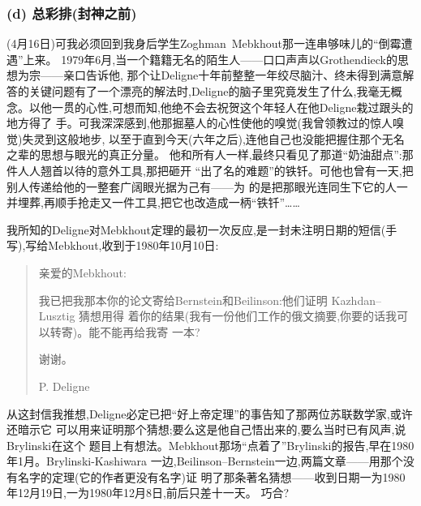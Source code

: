 \subsubsection*{(d) 总彩排(封神之前)}

(4月16日)可我必须回到我身后学生Zoghman~Mebkhout那一连串够味儿的“倒霉遭遇”上来。
\dmark{}1979年6月,当一个籍籍无名的陌生人——口口声声以Grothendieck的思想为宗——亲口告诉他,
那个让Deligne十年前整整一年绞尽脑汁、终未得到满意解答的关键问题有了一个漂亮的解法时,Deligne的脑子里究竟发生了什么,我毫无概
念。以他一贯的心性,可想而知,他绝不会去祝贺这个年轻人在他Deligne栽过跟头的地方得了
手。可我深深感到,他那掘墓人的心性使他的嗅觉(我曾领教过的惊人嗅觉)失灵到这般地步,
以至于直到今天(六年之后),连他自己也没能把握住那个无名之辈的思想与眼光的真正分量。
他和所有人一样,最终只看见了那道“奶油甜点”:那件人人翘首以待的意外工具,那把砸开
“出了名的难题”的铁钎。可他也曾有一天,把别人传递给他的一整套广阔眼光据为己有——为
的是把那眼光连同生下它的人一并埋葬,再顺手抢走又一件工具,把它也改造成一柄“铁钎”……

我所知的Deligne对Mebkhout定理的最初一次反应,是一封未注明日期的短信(手写),写给Mebkhout,收到于1980年10月10日:

\begin{quote}
亲爱的Mebkhout:

我已把我那本你的论文寄给Bernstein和Beilinson:他们证明 Kazhdan--Lusztig 猜想用得
着你的结果(我有一份他们工作的俄文摘要,你要的话我可以转寄)。能不能再给我寄
一本?

谢谢。

P. Deligne
\end{quote}

从这封信我推想,Deligne必定已把“好上帝定理”的事告知了那两位苏联数学家,或许还暗示它
可以用来证明那个猜想;要么这是他自己悟出来的,要么当时已有风声,说Brylinski在这个
题目上有想法。Mebkhout那场“点着了”Brylinski的报告,早在1980年1月。Brylinski-Kashiwara
一边,Beilinson--Bernstein一边,两篇文章——用那个没有名字的定理(它的作者更没有名字)证
明了那条著名猜想——\dmark{}收到日期一为1980年12月19日,一为1980年12月8日,前后只差十一天。
巧合?

